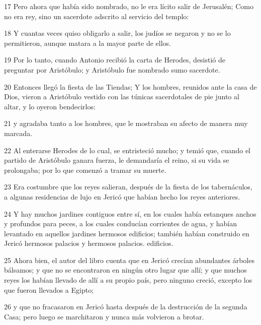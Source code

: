 \par 17 Pero ahora que había sido nombrado, no le era lícito salir de Jerusalén; Como no era rey, sino un sacerdote adscrito al servicio del templo:

\par 18 Y cuantas veces quiso obligarlo a salir, los judíos se negaron y no se lo permitieron, aunque matara a la mayor parte de ellos.

\par 19 Por lo tanto, cuando Antonio recibió la carta de Herodes, desistió de preguntar por Aristóbulo; y Aristóbulo fue nombrado sumo sacerdote.

\par 20 Entonces llegó la fiesta de las Tiendas; Y los hombres, reunidos ante la casa de Dios, vieron a Aristóbulo vestido con las túnicas sacerdotales de pie junto al altar, y lo oyeron bendecirlos:

\par 21 y agradaba tanto a los hombres, que le mostraban su afecto de manera muy marcada.

\par 22 Al enterarse Herodes de lo cual, se entristeció mucho; y temió que, cuando el partido de Aristóbulo ganara fuerza, le demandaría el reino, si su vida se prolongaba; por lo que comenzó a tramar su muerte.

\par 23 Era costumbre que los reyes salieran, después de la fiesta de los tabernáculos, a algunas residencias de lujo en Jericó que habían hecho los reyes anteriores.

\par 24 Y hay muchos jardines contiguos entre sí, en los cuales había estanques anchos y profundos para peces, a los cuales conducían corrientes de agua, y habían levantado en aquellos jardines hermosos edificios; también habían construido en Jericó hermosos palacios y hermosos palacios. edificios.

\par 25 Ahora bien, el autor del libro cuenta que en Jericó crecían abundantes árboles bálsamos; y que no se encontraron en ningún otro lugar que allí; y que muchos reyes los habían llevado de allí a su propio país, pero ninguno creció, excepto los que fueron llevados a Egipto;

\par 26 y que no fracasaron en Jericó hasta después de la destrucción de la segunda Casa; pero luego se marchitaron y nunca más volvieron a brotar.

